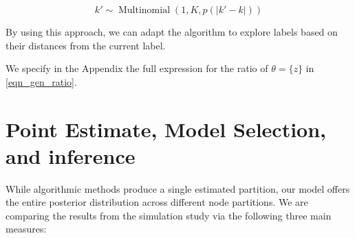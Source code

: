 \documentclass[11pt]{amsart}
\begin{document}
\begin{equation}
k' \sim \operatorname{Multinomial}(1, K, p(|k' - k|))
\end{equation}

By using this approach, we can adapt the algorithm to explore labels based on their distances from the current label. 

We specify in the Appendix the full expression for the ratio of $\theta = \{z\}$ in \eqref{eqn_gen_ratio}.





\clearpage

\section{Point Estimate, Model Selection,  and inference}

While algorithmic methods produce a single estimated partition, our model offers the entire posterior distribution across different node partitions. We are comparing the results from the simulation study via the following three main measures:
\end{document}
